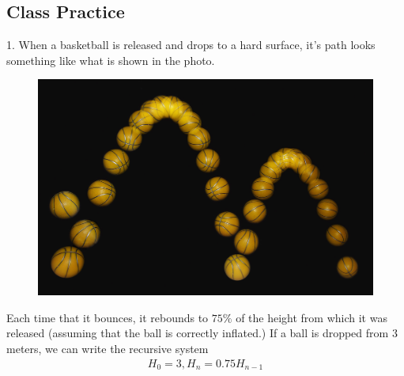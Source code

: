 \documentclass[10pt,]{book}
\theoremstyle{plain}
\theoremstyle{definition}
\theoremstyle{definition}
\theoremstyle{definition}
\numberwithin{equation}{section}
\begin{document}
\subsection[{Class Practice}]{Class Practice}\label{exercises-4}
\begin{exerciselist}
\item[1.]\hypertarget{exercise-18}{}When a basketball is released and drops to a hard surface, it's path looks something like what is shown in the photo.%
\begin{figure}
\centering
\includegraphics[width=0.5\linewidth]{src/images/bouncing_ball_strobe_edit.jpg}
\caption{\label{figure-9}}
\end{figure}
Each time that it bounces, it rebounds to \(75\%\) of the height from which it was released (assuming that the ball is correctly inflated.) If a ball is dropped from \(3\) meters, we can write the recursive system%
%
\begin{gather*}
H_0=3, H_n = 0.75 H_{n-1}
\end{gather*}
\begin{figure}
\centering
{
}
\end{figure}
\end{exerciselist}
\end{document}
